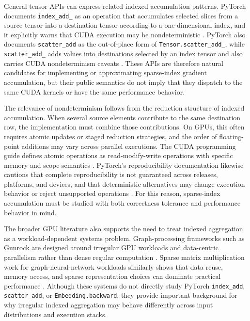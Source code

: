 General tensor APIs can express related indexed accumulation patterns. PyTorch documents \texttt{index\_add\_} as an operation that accumulates selected slices from a source tensor into a destination tensor according to a one-dimensional index, and it explicitly warns that CUDA execution may be nondeterministic \cite{pytorchStableIndexAdd}. PyTorch also documents \texttt{scatter\_add} as the out-of-place form of \texttt{Tensor.scatter\_add\_}, while \texttt{scatter\_add\_} adds values into destinations selected by an index tensor and also carries CUDA nondeterminism caveats \cite{pytorchStableScatterAdd,pytorchStableTensorScatterAdd}. These APIs are therefore natural candidates for implementing or approximating sparse-index gradient accumulation, but their public semantics do not imply that they dispatch to the same CUDA kernels or have the same performance behavior.

The relevance of nondeterminism follows from the reduction structure of indexed accumulation. When several source elements contribute to the same destination row, the implementation must combine those contributions. On GPUs, this often requires atomic updates or staged reduction strategies, and the order of floating-point additions may vary across parallel executions. The CUDA programming guide defines atomic operations as read-modify-write operations with specific memory and scope semantics \cite{nvidia2026cudaguide}. PyTorch's reproducibility documentation likewise cautions that complete reproducibility is not guaranteed across releases, platforms, and devices, and that deterministic alternatives may change execution behavior or reject unsupported operations \cite{pytorchStableReproducibility}. For this reason, sparse-index accumulation must be studied with both correctness tolerance and performance behavior in mind.

The broader GPU literature also supports the need to treat indexed aggregation as a workload-dependent systems problem. Graph-processing frameworks such as Gunrock are designed around irregular GPU workloads and data-centric parallelism rather than dense regular computation \cite{wang2016gunrock}. Sparse matrix multiplication work for graph-neural-network workloads similarly shows that data reuse, memory access, and sparse representation choices can dominate practical performance \cite{huang2020gespmm}. Although these systems do not directly study PyTorch \texttt{index\_add}, \texttt{scatter\_add}, or \texttt{Embedding.backward}, they provide important background for why irregular indexed aggregation may behave differently across input distributions and execution stacks.

